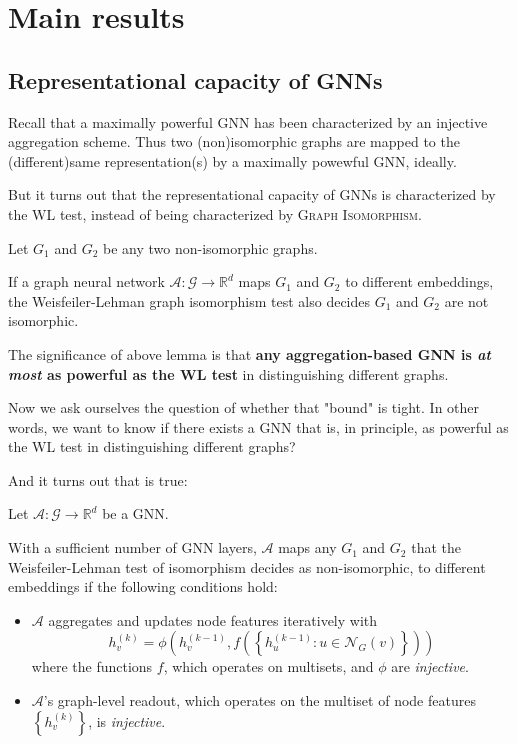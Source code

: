 \chapter{Main results}

\section{Representational capacity of GNNs}

Recall that a maximally powerful GNN has been characterized by an injective aggregation scheme. Thus two (non)isomorphic graphs are mapped to the (different)same representation(s) by a maximally powewful GNN, ideally.

But it turns out that the representational capacity of GNNs is characterized by the WL test, instead of being characterized by \textsc{Graph Isomorphism}.

\begin{lemma}
Let $G_1$ and $G_2$ be any two non-isomorphic graphs.

\noindent If a graph neural network $\mathcal{A} : \mathcal{G} \rightarrow \mathbb{R}^d$ maps $G_1$ and $G_2$ to different embeddings, the Weisfeiler-Lehman graph isomorphism test also decides $G_1$ and $G_2$ are not isomorphic.
\end{lemma}

The significance of above lemma is that {\bf any aggregation-based GNN is {\it at most} as powerful as the WL test} in distinguishing different graphs.

Now we ask ourselves the question of whether that "bound" is tight. In other words, we want to know if there exists a GNN that is, in principle, as powerful as the WL test in distinguishing different graphs?

And it turns out that is true:

\begin{theorem}
Let $\mathcal{A} : \mathcal{G} \rightarrow \mathbb{R}^d$ be a GNN.

\noindent With a sufficient number of GNN layers, $\mathcal{A}$ maps any $G_1$ and $G_2$ that the Weisfeiler-Lehman test of isomorphism decides as non-isomorphic, to different embeddings if the following conditions hold:

\begin{itemize}
\item $\mathcal{A}$ aggregates and updates node features iteratively with
$$h_v^{(k)} = \phi \left( h_v^{(k - 1)}, f \left( \left\{ h_u^{(k - 1)} : u \in \mathcal{N}_G(v) \right\} \right) \right)$$
where the functions $f$, which operates on multisets, and $\phi$ are {\it injective}.
\item $\mathcal{A}$'s graph-level readout, which operates on the multiset of node features $\left\{ h_v^{(k)} \right\}$, is {\it injective}.
\end{itemize}
\end{theorem}

